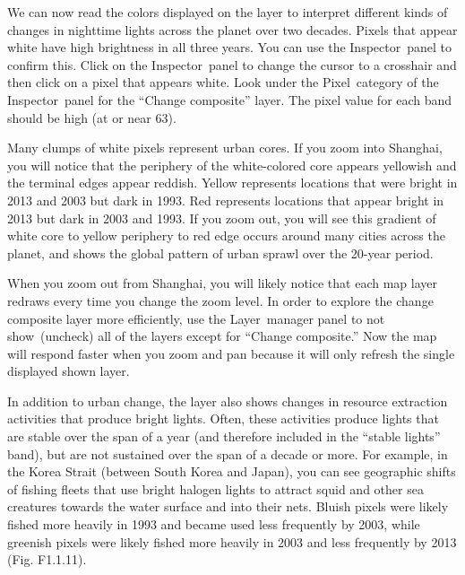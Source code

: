 \documentclass[
  letterpaper,
  DIV=11,
  numbers=noendperiod]{scrreprt}
\begin{document}
We can now read the colors displayed on the layer to interpret different
kinds of changes in nighttime lights across the planet over two decades.
Pixels that appear white have high brightness in all three years. You
can use the Inspector~panel to confirm this. Click on the
Inspector~panel to change the cursor to a crosshair and then click on a
pixel that appears white. Look under the Pixel~category of the
Inspector~panel for the ``Change composite'' layer. The pixel value for
each band should be high (at or near 63). ~

Many clumps of white pixels represent urban cores. If you zoom into
Shanghai, you will notice that the periphery of the white-colored core
appears yellowish and the terminal edges appear reddish. Yellow
represents locations that were bright in 2013 and 2003 but dark in 1993.
Red represents locations that appear bright in 2013 but dark in 2003 and
1993. If you zoom out, you will see this gradient of white core to
yellow periphery to red edge occurs around many cities across the
planet, and shows the global pattern of urban sprawl over the 20-year
period.~

When you zoom out from Shanghai, you will likely notice that each map
layer redraws every time you change the zoom level. In order to explore
the change composite layer more efficiently, use the Layer~manager panel
to not show~(uncheck) all of the layers except for ``Change composite.''
Now the map will respond faster when you zoom and pan because it will
only refresh the single displayed shown layer.

In addition to urban change, the layer also shows changes in resource
extraction activities that produce bright lights. Often, these
activities produce lights that are stable over the span of a year (and
therefore included in the ``stable lights'' band), but are not sustained
over the span of a decade or more. For example, in the Korea Strait
(between South Korea and Japan), you can see geographic shifts of
fishing fleets that use bright halogen lights to attract squid and other
sea creatures towards the water surface and into their nets. Bluish
pixels were likely fished more heavily in 1993 and became used less
frequently by 2003, while greenish pixels were likely fished more
heavily in 2003 and less frequently by 2013 (Fig. F1.1.11).
\end{document}

